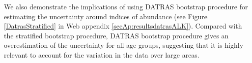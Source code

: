 \documentclass[a4paper 12pt]{article}
\numberwithin{equation}{section}
\begin{document}
We also demonstrate the implications of using DATRAS bootstrap procedure for estimating the uncertainty around indices of abundance (see Figure \ref{DatrasStratified} in Web appendix \ref{secAp:resultsdatrasALK}). Compared with the stratified bootstrap procedure, DATRAS bootstrap procedure gives an overestimation of the uncertainty for all age groups, suggesting that it is highly relevant to account for the variation in the data over large areas. 






\clearpage


\end{document}
